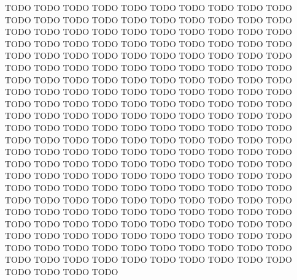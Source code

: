 TODO TODO TODO TODO TODO TODO TODO TODO TODO TODO TODO TODO TODO TODO TODO TODO 
TODO TODO TODO TODO TODO TODO TODO TODO TODO TODO TODO TODO TODO TODO TODO TODO 
TODO TODO TODO TODO TODO TODO TODO TODO TODO TODO TODO TODO TODO TODO TODO TODO 
TODO TODO TODO TODO TODO TODO TODO TODO TODO TODO TODO TODO TODO TODO TODO TODO 
TODO TODO TODO TODO TODO TODO TODO TODO TODO TODO TODO TODO TODO TODO TODO TODO 
TODO TODO TODO TODO TODO TODO TODO TODO TODO TODO TODO TODO TODO TODO TODO TODO 
TODO TODO TODO TODO TODO TODO TODO TODO TODO TODO TODO TODO TODO TODO TODO TODO 
TODO TODO TODO TODO TODO TODO TODO TODO TODO TODO TODO TODO TODO TODO TODO TODO 
TODO TODO TODO TODO TODO TODO TODO TODO TODO TODO TODO TODO TODO TODO TODO TODO 
TODO TODO TODO TODO TODO TODO TODO TODO TODO TODO TODO TODO TODO TODO TODO TODO 
TODO TODO TODO TODO TODO TODO TODO TODO TODO TODO TODO TODO TODO TODO TODO TODO 
TODO TODO TODO TODO TODO TODO TODO TODO TODO TODO TODO TODO TODO TODO TODO TODO 
TODO TODO TODO TODO TODO TODO TODO TODO TODO TODO TODO TODO TODO TODO TODO TODO 
TODO TODO TODO TODO TODO TODO TODO TODO TODO TODO TODO TODO TODO TODO TODO TODO 

\begin{figure}

\vspace*{-3ex}
\end{figure}



